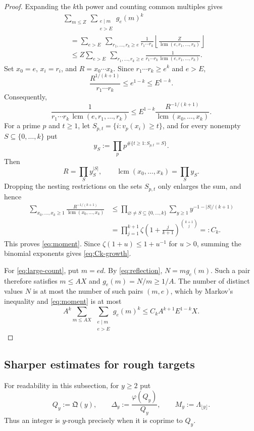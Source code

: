 \documentclass[11pt]{article}
\theoremstyle{remark}
\newcommand{\1}{\mathbf 1}
\DeclareMathOperator{\lcm}{lcm}
\begin{document}
\begin{proof}
Expanding the $k$th power and counting common multiples gives
\begin{align*}
 &\sum_{m\leq Z}\ \sum_{\substack{e\mid m\\e>E}}g_e(m)^k\\
 &\quad=\sum_{e>E}\ \sum_{r_1,\ldots,r_k\geq e}
 \frac1{r_1\cdots r_k}
 \left\lfloor\frac{Z}{\lcm(e,r_1,\ldots,r_k)}\right\rfloor\\
 &\quad\leq Z\sum_{e>E}\ \sum_{r_1,\ldots,r_k\geq e}
 \frac1{r_1\cdots r_k\,\lcm(e,r_1,\ldots,r_k)}.
\end{align*}
Set $x_0=e$, $x_i=r_i$, and $R=x_0\cdots x_k$.  Since
$r_1\cdots r_k\geq e^k$ and $e>E$,
\[
 \frac{R^{1/(k+1)}}{r_1\cdots r_k}
 \leq e^{1-k}\leq E^{1-k}.
\]
Consequently,
\[
 \frac1{r_1\cdots r_k\,\lcm(e,r_1,\ldots,r_k)}
 \leq E^{1-k}\frac{R^{-1/(k+1)}}{\lcm(x_0,\ldots,x_k)}.
\]
For a prime $p$ and $t\geq1$, let
$S_{p,t}=\{i:v_p(x_i)\geq t\}$, and for every nonempty
$S\subseteq\{0,\ldots,k\}$ put
\[
 y_S:=\prod_p p^{\#\{t\geq1:S_{p,t}=S\}}.
\]
Then
\[
 R=\prod_S y_S^{|S|},\qquad \lcm(x_0,\ldots,x_k)=\prod_S y_S.
\]
Dropping the nesting restrictions on the sets $S_{p,t}$ only enlarges the
sum, and hence
\begin{align*}
 \sum_{x_0,\ldots,x_k\geq1}
 \frac{R^{-1/(k+1)}}{\lcm(x_0,\ldots,x_k)}
 &\leq\prod_{\varnothing\ne S\subseteq\{0,\ldots,k\}}
 \sum_{y\geq1}y^{-1-|S|/(k+1)}\\
 &=\prod_{j=1}^{k+1}
 \zeta\!\left(1+\frac{j}{k+1}\right)^{\binom{k+1}{j}}
 =:C_k.
\end{align*}
This proves \eqref{eq:moment}.  Since
$\zeta(1+u)\leq1+u^{-1}$ for $u>0$, summing the binomial exponents gives
\eqref{eq:Ck-growth}.

For \eqref{eq:large-count}, put $m=ed$.  By \eqref{eq:reflection},
$N=mg_e(m)$.  Such a pair therefore satisfies
$m\leq AX$ and $g_e(m)=N/m\geq1/A$.  The number of distinct values $N$ is
at most the number of such pairs $(m,e)$, which by Markov's inequality and
\eqref{eq:moment} is at most
\[
 A^k\sum_{m\leq AX}\ \sum_{\substack{e\mid m\\e>E}}g_e(m)^k
 \leq C_kA^{k+1}E^{1-k}X.
\]
\end{proof}

\subsection{Sharper estimates for rough targets}

For readability in this subsection, for $y\geq2$ put
\[
 Q_y:=\mathfrak Q(y),\qquad
 \Delta_y:=\frac{\varphi(Q_y)}{Q_y},\qquad
 M_y:=\Lambda_{\lfloor y\rfloor}.
\]
Thus an integer is $y$-rough precisely when it is coprime to $Q_y$.
\end{document}
